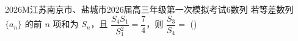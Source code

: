 
\begin{problem}{2026}{M}{江苏南京市、盐城市2026届高三年级第一次模拟考试}{6}{数列}
若等差数列 $\{a_n\}$ 的前 $n$ 项和为 $S_n$，且 $\dfrac{S_4 S_1}{S_1^2}=\dfrac{7}{4}$，则 $\dfrac{S_3}{S_4}=$
(\hspace{1cm})
\begin{choices}
\end{choices}
\end{problem}